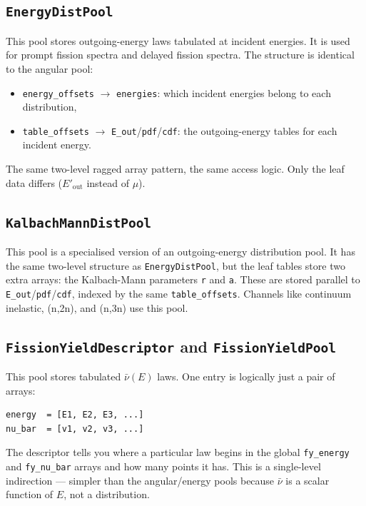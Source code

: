 \documentclass[11pt,a4paper]{article}
\begin{document}
\subsection{\texttt{EnergyDistPool}}
This pool stores outgoing-energy laws tabulated at incident energies. It is used for prompt fission spectra and delayed fission spectra. The structure is identical to the angular pool:
\begin{itemize}[leftmargin=1.4em]
  \item \texttt{energy\_offsets} $\to$ \texttt{energies}: which incident energies belong to each distribution,
  \item \texttt{table\_offsets} $\to$ \texttt{E\_out}/\texttt{pdf}/\texttt{cdf}: the outgoing-energy tables for each incident energy.
\end{itemize}
The same two-level ragged array pattern, the same access logic. Only the leaf data differs ($E'_\text{out}$ instead of $\mu$).

\subsection{\texttt{KalbachMannDistPool}}
This pool is a specialised version of an outgoing-energy distribution pool. It has the same two-level structure as \texttt{EnergyDistPool}, but the leaf tables store two extra arrays: the Kalbach-Mann parameters \texttt{r} and \texttt{a}. These are stored parallel to \texttt{E\_out}/\texttt{pdf}/\texttt{cdf}, indexed by the same \texttt{table\_offsets}. Channels like continuum inelastic, (n,2n), and (n,3n) use this pool.

\subsection{\texttt{FissionYieldDescriptor} and \texttt{FissionYieldPool}}
This pool stores tabulated $\bar\nu(E)$ laws. One entry is logically just a pair of arrays:
\begin{lstlisting}
energy  = [E1, E2, E3, ...]
nu_bar  = [v1, v2, v3, ...]
\end{lstlisting}
The descriptor tells you where a particular law begins in the global \texttt{fy\_energy} and \texttt{fy\_nu\_bar} arrays and how many points it has. This is a single-level indirection --- simpler than the angular/energy pools because $\bar\nu$ is a scalar function of $E$, not a distribution.
\end{document}
